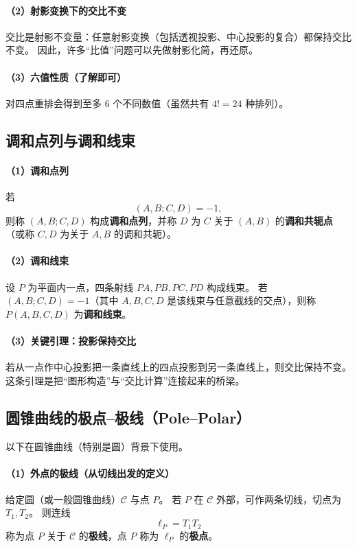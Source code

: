 \documentclass[UTF8]{ctexart}
\begin{document}
	\paragraph{（2）射影变换下的交比不变}
	交比是射影不变量：任意射影变换（包括透视投影、中心投影的复合）都保持交比不变。
	因此，许多“比值”问题可以先做射影化简，再还原。
	
	\paragraph{（3）六值性质（了解即可）}
	对四点重排会得到至多 $6$ 个不同数值（虽然共有 $4!=24$ 种排列）。
	
	\subsection{调和点列与调和线束}
	\paragraph{（1）调和点列}
	若
	\[
	(A,B;C,D)=-1,
	\]
	则称 $(A,B;C,D)$ 构成\textbf{调和点列}，并称 $D$ 为 $C$ 关于 $(A,B)$ 的\textbf{调和共轭点}（或称 $C,D$ 为关于 $A,B$ 的调和共轭）。
	
	\paragraph{（2）调和线束}
	设 $P$ 为平面内一点，四条射线 $PA,PB,PC,PD$ 构成线束。
	若 $(A,B;C,D)=-1$（其中 $A,B,C,D$ 是该线束与任意截线的交点），则称 $P(A,B,C,D)$ 为\textbf{调和线束}。
	
	\paragraph{（3）关键引理：投影保持交比}
	若从一点作中心投影把一条直线上的四点投影到另一条直线上，则交比保持不变。
	这条引理是把“图形构造”与“交比计算”连接起来的桥梁。
	
	\subsection{圆锥曲线的极点--极线（Pole--Polar）}
	以下在圆锥曲线（特别是圆）背景下使用。
	
	\paragraph{（1）外点的极线（从切线出发的定义）}
	给定圆（或一般圆锥曲线）$\mathcal{C}$ 与点 $P$。
	若 $P$ 在 $\mathcal{C}$ 外部，可作两条切线，切点为 $T_1,T_2$。
	则连线
	\[
	\ell_P = T_1T_2
	\]
	称为点 $P$ 关于 $\mathcal{C}$ 的\textbf{极线}，点 $P$ 称为 $\ell_P$ 的\textbf{极点}。
	
\end{document}
